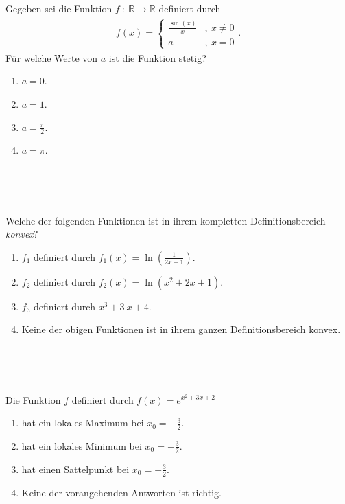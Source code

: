 \subsection*{}
Gegeben sei die Funktion $f \ : \ \mathbb{R} \to \mathbb{R}$ definiert durch
\begin{align*}
f(x) 
= 
\begin{cases}
\frac{\sin(x)}{x}& , \ x \neq 0\\
a& ,		\  x = 0
\end{cases}.
\end{align*}
Für welche Werte von $a$ ist die Funktion stetig?
\begin{enumerate}
\item $a=0$.
\item $a=1$.
\item $a = \frac{\pi}{2}$.
\item $a = \pi$.
\end{enumerate}
\ \\
\\
\subsection*{}
Welche der folgenden Funktionen ist in ihrem kompletten Definitionsbereich \textit{konvex}?
\renewcommand{\labelenumi}{(\alph{enumi})}
\begin{enumerate}
\item $f_1$ definiert durch $f_1(x) = \ln \left(\frac{1}{2x +1} \right)$.
\item $f_2$ definiert durch $f_2(x) = \ln(x^2 + 2x +1 )$.
\item $f_3$ definiert durch $x^3 + 3 \ x + 4 $.
\item Keine der obigen Funktionen ist in ihrem ganzen Definitionsbereich konvex.
\end{enumerate}
\ \\
\\
\subsection*{}
Die Funktion $f$ definiert durch $f(x) = e^{x^2+3x+2}$
\renewcommand{\labelenumi}{(\alph{enumi})}
\begin{enumerate}
\item hat ein lokales Maximum bei $x_0 = -\frac{3}{2}$.
\item hat ein lokales Minimum bei $x_0 = -\frac{3}{2}$.
\item hat einen Sattelpunkt bei $x_0 = -\frac{3}{2}$.
\item Keine der vorangehenden Antworten ist richtig.
\end{enumerate}

